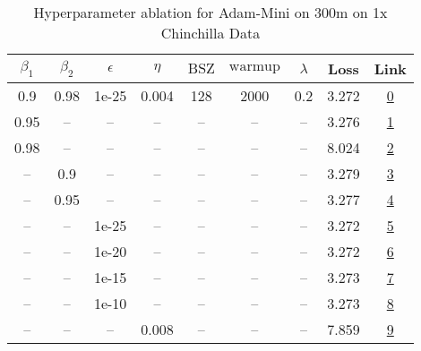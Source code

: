\begin{table}[H]
\centering
\caption{Hyperparameter ablation for Adam-Mini on 300m on 1x Chinchilla Data}
\label{tab:ablation_adam-mini_300m_1}
\begin{tabular}{ccccccccc}
\toprule
$\beta_1$ & $\beta_2$ & $\epsilon$ & $\eta$ & $\mathrm{BSZ}$ & $\mathrm{warmup}$ & $\lambda$ & Loss & Link \\
\midrule
0.9 & 0.98 & 1e-25 & 0.004 & 128 & 2000 & 0.2 & 3.272 & \href{https://wandb.ai/stanford-mercury/optimizer-scaling/runs/sweep-300m-6B-minimf93988lr0.004-wd0.2-minlr0-warmup2000-b10.9-b-1a622b}{0} \\
\midrule
0.95 & -- & -- & -- & -- & -- & -- & 3.276 & \href{https://wandb.ai/stanford-mercury/optimizer-scaling/runs/sweep-300m-6B-minic68fa6lr0.004-wd0.2-minlr0-warmup2000-b10.95-b-61c14d}{1} \\
0.98 & -- & -- & -- & -- & -- & -- & 8.024 & \href{https://wandb.ai/stanford-mercury/optimizer-scaling/runs/sweep-300m-6B-minie808f4lr0.004-wd0.2-minlr0-warmup2000-b10.98-b-2ad92e}{2} \\
-- & 0.9 & -- & -- & -- & -- & -- & 3.279 & \href{https://wandb.ai/stanford-mercury/optimizer-scaling/runs/sweep-300m-6B-minim7e5831lr0.004-wd0.2-minlr0-warmup2000-b10.9-b-3f89ca}{3} \\
-- & 0.95 & -- & -- & -- & -- & -- & 3.277 & \href{https://wandb.ai/stanford-mercury/optimizer-scaling/runs/sweep-300m-6B-mini3022d1lr0.004-wd0.2-minlr0-warmup2000-b10.9-b2-0db993}{4} \\
-- & -- & 1e-25 & -- & -- & -- & -- & 3.272 & \href{https://wandb.ai/stanford-mercury/optimizer-scaling/runs/sweep-300m-6B-minimf93988lr0.004-wd0.2-minlr0-warmup2000-b10.9-b-1a622b}{5} \\
-- & -- & 1e-20 & -- & -- & -- & -- & 3.272 & \href{https://wandb.ai/stanford-mercury/optimizer-scaling/runs/sweep-300m-6B-mini3ff087lr0.004-wd0.2-minlr0-warmup2000-b10.9-b2-e0d948}{6} \\
-- & -- & 1e-15 & -- & -- & -- & -- & 3.273 & \href{https://wandb.ai/stanford-mercury/optimizer-scaling/runs/sweep-300m-6B-minim4cb19elr0.004-wd0.2-minlr0-warmup2000-b10.9-b-4a59e2}{7} \\
-- & -- & 1e-10 & -- & -- & -- & -- & 3.273 & \href{https://wandb.ai/stanford-mercury/optimizer-scaling/runs/sweep-300m-6B-minim8dac9blr0.004-wd0.2-minlr0-warmup2000-b10.9-b-2ed5f7}{8} \\
-- & -- & -- & 0.008 & -- & -- & -- & 7.859 & \href{https://wandb.ai/stanford-mercury/optimizer-scaling/runs/sweep-300m-6B-minim70e785lr0.008-wd0.2-minlr0-warmup2000-b10.9-b-8588ff}{9} \\

\end{tabular}
\end{table}
